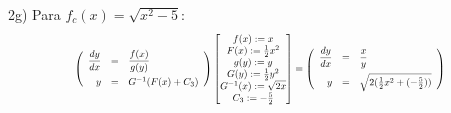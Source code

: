 \documentclass[oneside,12pt]{article}
\begin{document}
\bsk
\bsk


2g) Para $f_c(x) = \sqrt{x^2 - 5}$:
%
\def\SubstQuestaoUmTmp{
  \bmat{ f(x) := x \\
         F(x) := \frac12 x^2 \\
         g(y) := y \\
         G(y) := \frac12 y^2 \\
         G^{-1}(x) := \sqrt{2x} \\
         C_3 := - \frac52 \\
       }
  }
\def\EDOVSGtwoTmp{
  \left(
  \begin{array}{rcl}
  \D \frac{dy}{dx} &=& \D \frac{x}{y} \\ [10pt]
                 y &=& \sqrt{2(\frac12 x^2 + (-\frac52))}   \\
  \end{array}
  \right)
  }
%
$$\scalebox{0.7}{$
    \EDOVSGtwo
    \SubstQuestaoUmTmp
    =
    \EDOVSGtwoTmp
  $}
$$







\end{document}
